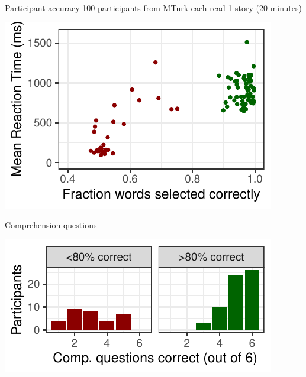 \documentclass[12pt, xcolor=beamer,table,usenames,dvipsnames, ignorenonframetext, ngerman,t]{beamer}
\begin{document}
\begin{frame}{Participant accuracy}
100 participants from MTurk each read 1 story (20 minutes) \pause
\begin{center}
\includegraphics[width=.8\textwidth]{../error.pdf}
\end{center}
\end{frame}

\begin{frame}{Comprehension questions}
\begin{center} \pause
\includegraphics[width=.8\textwidth]{../comp.pdf}
\end{center}
\end{frame}
\end{document}
